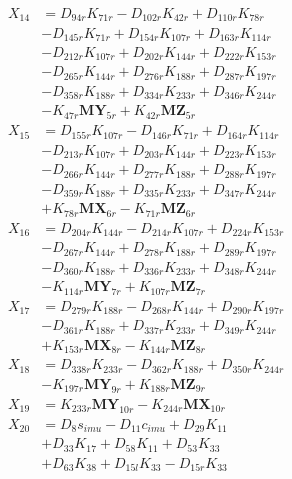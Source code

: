 \begin{multicols}{2}
\begin{align}
X_{14} &= D_{94r}K_{71r} - D_{102r}K_{42r} + D_{110r}K_{78r}  \nonumber \\
&- D_{145r}K_{71r} + D_{154r}K_{107r} + D_{163r}K_{114r}  \nonumber \\
&- D_{212r}K_{107r} + D_{202r}K_{144r} + D_{222r}K_{153r}  \nonumber \\
&- D_{265r}K_{144r} + D_{276r}K_{188r} + D_{287r}K_{197r}  \nonumber \\
&- D_{358r}K_{188r} + D_{334r}K_{233r} + D_{346r}K_{244r}  \nonumber \\
&- K_{47r}\mathbf{MY}_{5r} + K_{42r}\mathbf{MZ}_{5r} \nonumber \\
X_{15} &= D_{155r}K_{107r} - D_{146r}K_{71r} + D_{164r}K_{114r}  \nonumber \\
&- D_{213r}K_{107r} + D_{203r}K_{144r} + D_{223r}K_{153r}  \nonumber \\
&- D_{266r}K_{144r} + D_{277r}K_{188r} + D_{288r}K_{197r}  \nonumber \\
&- D_{359r}K_{188r} + D_{335r}K_{233r} + D_{347r}K_{244r}  \nonumber \\
&+ K_{78r}\mathbf{MX}_{6r} - K_{71r}\mathbf{MZ}_{6r} \nonumber \\
X_{16} &= D_{204r}K_{144r} - D_{214r}K_{107r} + D_{224r}K_{153r}  \nonumber \\
&- D_{267r}K_{144r} + D_{278r}K_{188r} + D_{289r}K_{197r}  \nonumber \\
&- D_{360r}K_{188r} + D_{336r}K_{233r} + D_{348r}K_{244r}  \nonumber \\
&- K_{114r}\mathbf{MY}_{7r} + K_{107r}\mathbf{MZ}_{7r} \nonumber \\
X_{17} &= D_{279r}K_{188r} - D_{268r}K_{144r} + D_{290r}K_{197r}  \nonumber \\
&- D_{361r}K_{188r} + D_{337r}K_{233r} + D_{349r}K_{244r}  \nonumber \\
&+ K_{153r}\mathbf{MX}_{8r} - K_{144r}\mathbf{MZ}_{8r} \nonumber \\
X_{18} &= D_{338r}K_{233r} - D_{362r}K_{188r} + D_{350r}K_{244r}  \nonumber \\
&- K_{197r}\mathbf{MY}_{9r} + K_{188r}\mathbf{MZ}_{9r} \nonumber \\
X_{19} &= K_{233r}\mathbf{MY}_{10r} - K_{244r}\mathbf{MX}_{10r} \nonumber \\
X_{20} &= D_{8}s_{imu} - D_{11}c_{imu} + D_{29}K_{11}  \nonumber \\
&+ D_{33}K_{17} + D_{58}K_{11} + D_{53}K_{33}  \nonumber \\
&+ D_{63}K_{38} + D_{15l}K_{33} - D_{15r}K_{33}  \nonumber \\

\end{align}
\end{multicols}
